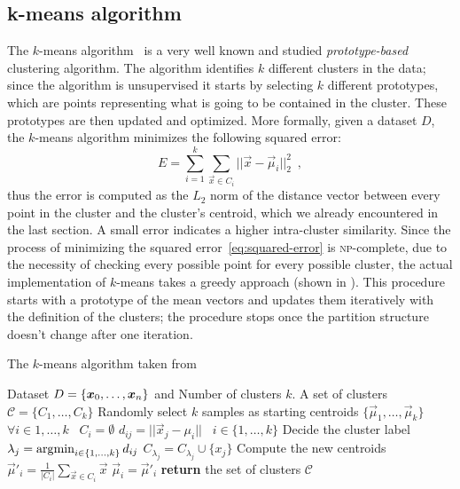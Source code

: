 \subsection{k-means algorithm}
The $k$-means algorithm~\cite{macqueen1967-kmeans, lloyd1982-kmeans} is a very well known and studied
\emph{prototype-based} clustering algorithm. The algorithm identifies $k$ different clusters in the
data; since the algorithm is unsupervised it starts by selecting $k$ different prototypes, which are
points representing what is going to be contained in the cluster. These prototypes are then updated
and optimized. More formally, given a dataset $D$, the $k$-means algorithm minimizes the following
squared error:
\begin{equation}
	\label{eq:squared-error}
	E = \sum_{i = 1}^k\sum_{\vec{x} \in C_i}||\vec{x} - \vec{\mu}_i||_2^2 \enspace,
\end{equation}
thus the error is computed as the $L_2$ norm of the distance vector between every point in the
cluster and the cluster's centroid, which we already encountered in the last section. A small error
indicates a higher intra-cluster similarity. Since the process of minimizing the squared
error~\ref{eq:squared-error} is \textsc{np}-complete, due to the necessity of checking every possible
point for every possible cluster, the actual implementation of $k$-means takes a greedy approach
(shown in ). This procedure starts with a prototype of the mean vectors and updates them iteratively with the definition of the clusters; the procedure stops once the partition structure doesn't change after one iteration.
\begin{algorithm}
	\caption{The $k$-means algorithm taken from~\cite{ZhouZhi-Hua2021ML}}\label{algo:kmeans}
	\begin{algorithmic}[1]
		\Require Dataset $D = \{\boldsymbol{x}_0, \allowbreak\ldots\allowbreak, \boldsymbol{x}_n\}$ and Number of clusters $k$.
		\Ensure A set of clusters $\mathcal{C} = \{C_1, \ldots, C_k\}$
		\State Randomly select $k$ samples as starting centroids $\{\vec{\mu}_1, \ldots,
		\vec{\mu}_k\}$
		\State $\forall i \in {1, \ldots, k} \hspace{10pt} C_i = \emptyset$
		\State $d_{ij} = ||\vec{x}_j - \mu_i|| \hspace{10pt} i \in \{1, \ldots, k\}$ 
		\State Decide the cluster label $\lambda_j = \operatorname*{\arg\!\min}_{i \in \{1, \ldots, k\}}d_{ij}$
		\State $C_{\lambda_j} = C_{\lambda_j}\cup\{x_j\}$
		\EndFor
		\State Compute the new centroids $\vec{\mu}'_i = \frac{1}{|C_i|} \sum_{\vec{x} \in C_i}\vec{x}$
		\EndFor
		\State $\vec{\mu}_i = \vec{\mu}'_i$
		\EndIf
		\EndWhile
		\State \textbf{return} the set of clusters $\mathcal{C}$
		\EndFunction
	\end{algorithmic}
\end{algorithm}












